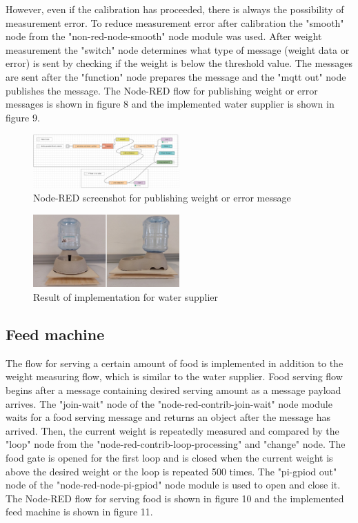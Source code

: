 ﻿\documentclass[conference]{IEEEtran}
\begin{document}
However, even if the calibration has proceeded, there is always the possibility of measurement error.
To reduce measurement error after calibration the "smooth" node from the "non-red-node-smooth" node module was used.
After weight measurement the "switch" node determines what type of message (weight data or error) is sent by checking if the weight is below the threshold value.
The messages are sent after the "function" node prepares the message and the "mqtt out" node publishes the message.
The Node-RED flow for publishing weight or error messages is shown in figure 8 and the implemented water supplier is shown in figure 9.


\begin{figure}[htbp]
\centerline{\includegraphics[width=0.5\textwidth]{./images/Water Supplier Error Detection.png}}
\caption{Node-RED screenshot for publishing weight or error message}
\label{fig}
\end{figure}

\begin{figure}[htbp]
\centerline{\includegraphics[width=0.5\textwidth]{./images/water-supplier.jpg}}
\caption{Result of implementation for water supplier}
\label{fig}
\end{figure}

\subsection{Feed machine}
The flow for serving a certain amount of food is implemented in addition to the weight measuring flow, which is similar to the water supplier.
Food serving flow begins after a message containing desired serving amount as a message payload arrives.
The "join-wait" node of the "node-red-contrib-join-wait" node module waits for a food serving message and returns an object after the message has arrived.
Then, the current weight is repeatedly measured and compared by the "loop" node from the "node-red-contrib-loop-processing" and "change" node.
The food gate is opened for the first loop and is closed when the current weight is above the desired weight or the loop is repeated 500 times. The "pi-gpiod out" node of the "node-red-node-pi-gpiod" node module is used to open and close it.
The Node-RED flow for serving food is shown in figure 10 and the implemented feed machine is shown in figure 11.
\end{document}
